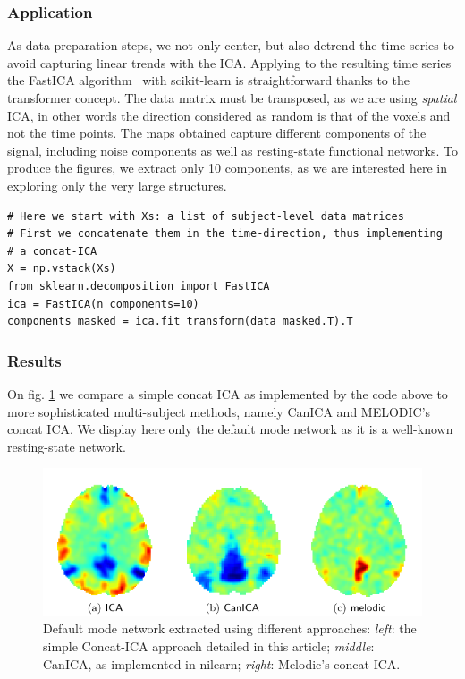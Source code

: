 \documentclass{frontiersSCNS} %
\begin{document}
\subsubsection{Application}

As data preparation steps, we not only center, but also detrend the time
series to avoid capturing linear trends with the ICA. Applying to the
resulting time series the FastICA algorithm~\citep{Hyvarinen:2000vk} with scikit-learn is
straightforward thanks to the transformer concept. The data matrix must
be transposed, as we are using \emph{spatial} ICA, in other words the
direction considered as random is that of the voxels and not the time
points. The maps obtained capture different components of the signal,
including noise components as well as resting-state functional networks.
To produce the figures, we extract only 10 components, as we are
interested here in exploring only the very large structures.

\begin{lstlisting}
# Here we start with Xs: a list of subject-level data matrices
# First we concatenate them in the time-direction, thus implementing
# a concat-ICA
X = np.vstack(Xs)
from sklearn.decomposition import FastICA
ica = FastICA(n_components=10)
components_masked = ica.fit_transform(data_masked.T).T
\end{lstlisting}

\subsubsection{Results}

On fig. \ref{fig:ica} we compare a simple concat ICA as implemented by
the code above to more sophisticated multi-subject methods, namely CanICA
and MELODIC's concat ICA. We display here only the default mode network
as it is a well-known resting-state network.

\begin{figure}[hbtp]
  \centerline{\includegraphics[width=.9\linewidth]{img/ica/figure}}
  \caption{Default mode network extracted using different approaches:
\emph{left}: the simple Concat-ICA approach detailed in this article;
\emph{middle}: CanICA, as implemented in nilearn; \emph{right}: Melodic's
concat-ICA.}
  \label{fig:ica}
\end{figure}
\end{document}
